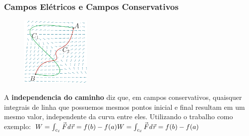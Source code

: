 \documentclass{beamer}
\def\vec{\mathaccent "017E\relax }
\begin{document}
\begin{frame}
    \frametitle{Campos Elétricos e Campos Conservativos}
    
    
    \begin{figure} %
        \vspace{-35pt}
        \centering
        \caption{}
        \includegraphics[width=0.30\textwidth]{grafico-trabalho.png}
        \label{fig:grafico-trabalho}
    \end{figure}
    
    A \textbf{independencia do caminho} diz que, em campos conservativos, quaisquer integrais de 
    linha que possuemos mesmos pontos inicial e final resultam em um mesmo valor, independente da curva entre eles. 
    Utilizando o trabalho como exemplo:  
    \hfill \break
    \hfill \break
    $    
        W = \mathit{\int_{c_1} \vec{F} d\vec{r}} = f(b) - f(a) 
        \hfill \break
        W = \mathit{\int_{c_2} \vec{F} d\vec{r}} = f(b) - f(a) 
    $

\end{frame}


\end{document}
